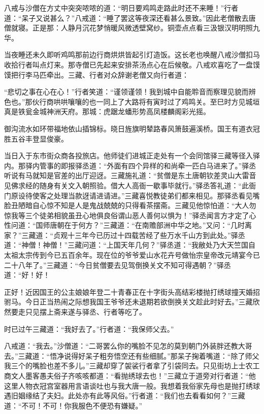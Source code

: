 \documentclass[12pt,UTF8]{ctexbook}
\begin{document}
{	八戒与沙僧在方丈中突突哝哝的道：“明日要鸡鸣走路此时还不来睡！”行者道：“呆子又说甚么？”八戒道：“睡了罢这等夜深还看甚么景致。”因此老僧散去唐僧就寝。正是那：人静月沉花梦悄暖风微透壁窝纱。铜壶点点看三汲银汉明明照九华。
	
	当夜睡还未久即听鸡鸣那前边行商烘烘皆起引灯造饭。这长老也唤醒八戒沙僧扣马收拾行者叫点灯来。那寺僧已先起来安排茶汤点心在后候敬。八戒欢喜吃了一盘馍馍把行李马匹牵出。三藏、行者对众辞谢老僧又向行者道：
	
	“悲切之事在心在心！”行者笑道：“谨领谨领！我到城中自能聆音而察理见貌而辨色也。”那伙行商哄哄嚷嚷的也一同上了大路将有寅时过了鸡鸣关。至巳时方见城垣真是铁瓮金城神洲天府。那城：虎踞龙蟠形势高凤楼麟阁彩光摇。
	
	御沟流水如环带福地依山插锦标。晓日旌旗明辇路春风箫鼓遍溪桥。国王有道衣冠胜五谷丰登显俊豪。
	
	当日入于东市街众商各投旅店。他师徒们进城正走处有一个会同馆驿三藏等径入驿内。那驿内管事的即报驿丞道：“外面有四个异样的和尚牵一匹白马进来了。”驿丞听说有马就知是官差的出厅迎迓。三藏施礼道：“贫僧是东土唐朝钦差灵山大雷音见佛求经的随身有关文入朝照验。借大人高衙一歇事毕就行。”驿丞答礼道：“此衙门原设待使客之处理当款迓请进请进。”三藏喜悦教徒弟们都来相见。那驿丞看见嘴脸丑陋暗自心惊不知是人是鬼战兢兢的只得看茶摆斋。三藏见他惊怕道：“大人勿惊我等三个徒弟相貌虽丑心地俱良俗谓山恶人善何以惧为！”驿丞闻言方才定了心性问道：“国师唐朝在于何方？”三藏道：“在南赡部洲中华之地。”又问：“几时离家？”三藏道：“贞观十三年今已历过十四载苦经了些万水千山方到此处。”驿丞道：“神僧！神僧！”三藏问道：“上国天年几何？”驿丞道：“我敝处乃大天竺国自太祖太宗传到今已五百余年。现在位的爷爷爱山水花卉号做怡宗皇帝改元靖宴今已二十八年了。”三藏道：“今日贫僧要去见驾倒换关文不知可得遇朝？”驿丞道：“好！好！
	
	正好！近因国王的公主娘娘年登二十青春正在十字街头高结彩楼抛打绣球撞天婚招驸马。今日正当热闹之际想我国王爷爷还未退期若欲倒换关文趁此时好去。”三藏欣然要走只见摆上斋来遂与驿丞、行者等吃了。
	
	时已过午三藏道：“我好去了。”行者道：“我保师父去。”
	
	八戒道：“我去。”沙僧道：“二哥罢么你的嘴脸不见怎的莫到朝门外装胖还教大哥去。”三藏道：“悟净说得好呆子粗夯悟空还有些细腻。”那呆子掬着嘴道：“除了师父我三个的嘴脸也差不多儿。”三藏却穿了袈裟行者拿了引袋同去。只见街坊上士农工商文人墨客愚夫俗子齐咳咳都道：“看抛绣球去也！”三藏立于道旁对行者道：“他这里人物衣冠宫室器用言语谈吐也与我大唐一般。我想着我俗家先母也是抛打绣球遇旧姻缘结了夫妇。此处亦有此等风俗。”行者道：“我们也去看看如何？”三藏道：“不可！不可！你我服色不便恐有嫌疑。”
	
}
\end{document}
